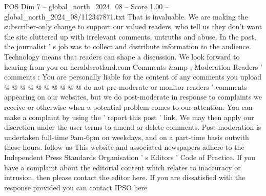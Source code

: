 \begin{textsample}{POS Dim 7 – global\_north\_2024\_08 – Score 1.00 – global\_north\_2024\_08/112347871.txt}
That is invaluable.
We are making the subscriber-only change to support our valued readers, who tell us they don't want the site cluttered up with irrelevant comments, untruths and abuse.
In the past, the journalist ' s job was to collect and distribute information to the audience.
Technology means that readers can shape a discussion.
We look forward to hearing from you on heraldscotland.com Comments \&amp ; Moderation Readers ' comments : You are personally liable for the content of any comments you upload @ @ @ @ @ @ @ @ @ @ do not pre-moderate or monitor readers ' comments appearing on our websites, but we do post-moderate in response to complaints we receive or otherwise when a potential problem comes to our attention.
You can make a complaint by using the ' report this post ' link.
We may then apply our discretion under the user terms to amend or delete comments.
Post moderation is undertaken full-time 9am-6pm on weekdays, and on a part-time basis outwith those hours. follow us This website and associated newspapers adhere to the Independent Press Standards Organisation ' s Editors ' Code of Practice.
If you have a complaint about the editorial content which relates to inaccuracy or intrusion, then please contact the editor here.
If you are dissatisfied with the response provided you can contact IPSO here

\end{textsample}
